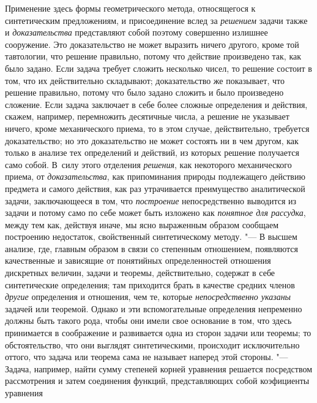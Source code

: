 Применение здесь формы геометрического метода, относящегося к
синтетическим предложениям, и присоединение вслед за
{\em решением} задачи
также и {\em доказательства}
представляют собой поэтому совершенно излишнее сооружение.
Это доказательство не может выразить ничего другого, кроме той тавтологии,
что решение правильно, потому что действие произведено так, как было
задано. Если задача требует сложить несколько чисел, то решение состоит в
том, что их действительно складывают; доказательство же показывает, что
решение правильно, потому что было задано сложить и было произведено
сложение. Если задача заключает в себе более сложные определения и
действия, скажем, например, перемножить десятичные
числа,
а решение не указывает ничего, кроме механического приема, то
в этом случае, действительно, требуется доказательство; но это
доказательство не может состоять ни в чем другом, как только в анализе тех
определений и действий, из которых решение получается само собой. В~силу
этого отделения {\em решения},
как некоторого механического приема, от
{\em доказательства}, как
припоминания природы подлежащего действию предмета и самого действия, как
раз утрачивается преимущество аналитической задачи, заключающееся в том,
что {\em построение}
непосредственно выводится из задачи и потому само по себе
может быть изложено как {\em понятное
для рассудка}, между тем как, действуя иначе, мы ясно
выраженным образом сообщаем построению недостаток, свойственный
синтетическому методу. "--- В высшем анализе, где, главным
образом в связи со степенным отношением, появляются качественные и
зависящие от понятийных определенностей отношения дискретных величин,
задачи и теоремы, действительно, содержат в себе синтетические определения;
там приходится брать в качестве средних членов
{\em другие} определения
и отношения, чем те, которые
{\em непосредственно указаны}
задачей или теоремой. Однако и эти вспомогательные
определения непременно должны быть такого рода, чтобы они имели свое
основание в том, что здесь принимается в соображение и развивается одна из
сторон задачи или теоремы; то обстоятельство, что они выглядят
синтетическими, происходит исключительно оттого, что задача или теорема
сама не называет наперед этой стороны. "--- Задача, например,
найти сумму степеней корней уравнения решается посредством рассмотрения и
затем соединения функций, представляющих собой коэфициенты уравнения
